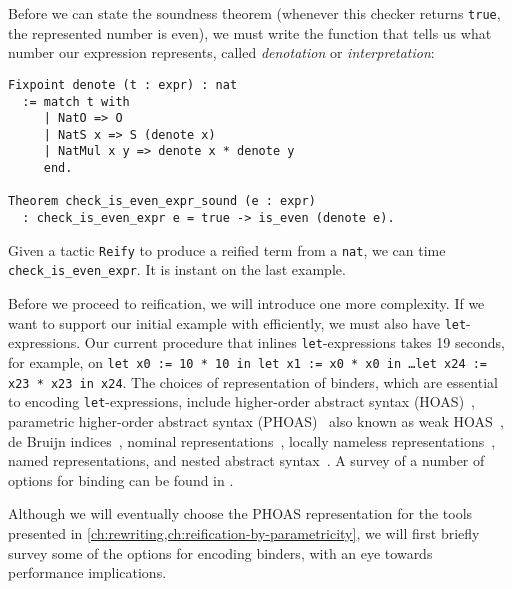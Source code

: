 Before we can state the soundness theorem (whenever this checker returns \texttt{true}, the represented number is even), we must write the function that tells us what number our expression represents, called \emph{denotation} or \emph{interpretation}:
\begin{verbatim}
Fixpoint denote (t : expr) : nat
  := match t with
     | NatO => O
     | NatS x => S (denote x)
     | NatMul x y => denote x * denote y
     end.

Theorem check_is_even_expr_sound (e : expr)
  : check_is_even_expr e = true -> is_even (denote e).
\end{verbatim}

Given a tactic \texttt{Reify} to produce a reified term from a \texttt{nat}, we can time \texttt{check_is_even_expr}.
It is instant on the last example.%

Before we proceed to reification, we will introduce one more complexity.
If we want to support our initial example with \space efficiently, we must also have \texttt{let}-expressions.
Our current procedure that inlines \texttt{let}-expressions takes 19 seconds, for example, on \texttt{let x0 := 10 * 10 in let x1 := x0 * x0 in \ldots\space let x24 := x23 * x23 in x24}.
The choices of representation of binders, which are essential to encoding \texttt{let}-expressions, include higher-order abstract syntax (HOAS)~\cite{HOAS}, parametric higher-order abstract syntax (PHOAS)~\cite{PhoasICFP08} also known as weak HOAS~\cite{weak2013Ciaffaglione}, de Bruijn indices~\cite{debruijn1972}, nominal representations~\cite{Nominal2003Pitts}, locally nameless representations~\cite{Locally2012Chargueraud,locally2007Leroy}, named representations, and nested abstract syntax~\cite{Nested2012Hirschowitz,deBruijn1999Bird}.
A survey of a number of options for binding can be found in \autocite{Engineering2008Aydemir}.

Although we will eventually choose the PHOAS representation for the tools presented in \autoref{ch:rewriting,ch:reification-by-parametricity}, we will first briefly survey some of the options for encoding binders, with an eye towards performance implications.

